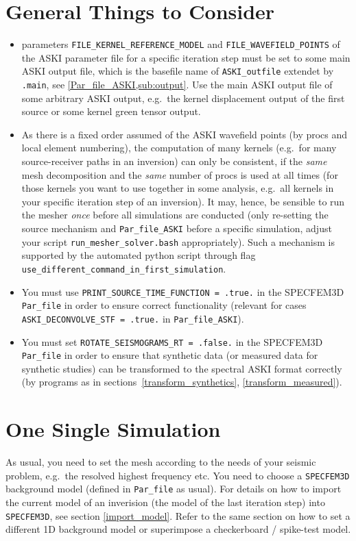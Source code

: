 \documentclass[12pt,a4paper]{article}
\newcommand{\lcode}[1]{\nolinkurl{#1}}
\newcommand{\ASKI}{ {\ttfamily ASKI} }
\begin{document}
\section{General Things to Consider} \label{general_stuff}
%
\begin{itemize}
\item parameters \lcode{FILE_KERNEL_REFERENCE_MODEL} and \lcode{FILE_WAVEFIELD_POINTS} 
  of the \ASKI parameter file for a specific iteration step must be set to some main \ASKI output file,
  which is the basefile name of \lcode{ASKI_outfile} extendet by \lcode{.main}, see \ref{Par_file_ASKI,sub:output}.
  Use the main \ASKI output file of some arbitrary \ASKI output, e.g.\ the kernel displacement output of the first source
  or some kernel green tensor output.
\item As there is a fixed order assumed of the \ASKI wavefield points (by procs and local element numbering), the 
  computation of many kernels (e.g.\ for many source-receiver paths in an inversion) can only be consistent, if the 
  \emph{same} mesh decomposition and the \emph{same} number of procs is used at all times 
  (for those kernels you want to use together in some analysis, e.g.\ all kernels in your specific iteration 
  step of an inversion).
  It may, hence, be sensible to run the mesher \emph{once} before all simulations are conducted (only re-setting the
  source mechanism and \lcode{Par_file_ASKI} before a specific simulation, adjust your 
  script \lcode{run_mesher_solver.bash} appropriately). Such a mechanism is supported by the automated python script
  through flag \lcode{use_different_command_in_first_simulation}.
\item You must use \lcode{PRINT_SOURCE_TIME_FUNCTION = .true.} in the SPECFEM3D \lcode{Par_file} in order to ensure correct
  functionality (relevant for cases \lcode{ASKI_DECONVOLVE_STF = .true.} in \lcode{Par_file_ASKI}).
\item You must set \lcode{ROTATE_SEISMOGRAMS_RT = .false.} in the SPECFEM3D \lcode{Par_file} in order to ensure that 
  synthetic data (or measured data for synthetic studies) can be transformed to the spectral \ASKI format correctly (by programs
  as in sections~\ref{transform_synthetics}, \ref{transform_measured}).
\end{itemize}
%
\section{One Single Simulation} \label{no_script}
%
As usual, you need to set the mesh according to the needs of your seismic problem, e.g.\ the
resolved highest frequency etc. You need to choose a \lcode{SPECFEM3D} background model (defined
in \lcode{Par_file} as usual). For details on how to import the current model of an inverision 
(the model of the last iteration step) into \lcode{SPECFEM3D}, see section \ref{import_model}.
Refer to the same section on how to set a different 1D background model or superimpose a 
checkerboard / spike-test model.
\end{document}
